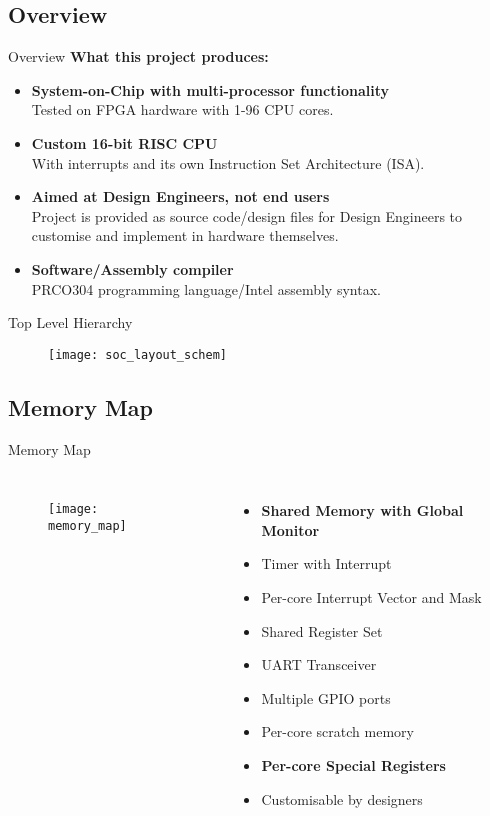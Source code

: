 \documentclass[aspectratio=169]{beamer}
\begin{document}
\subsection{Overview}
\begin{frame}{Overview}
\textbf{What this project produces:}
\begin{itemize}[<+->]\setlength\itemsep{1em}
    \item{\textbf{System-on-Chip with multi-processor functionality}\\
    Tested on FPGA hardware with 1-96 CPU cores.}
    \item{\textbf{Custom 16-bit RISC CPU}\\
    With interrupts and its own Instruction Set Architecture (ISA).}
    \item{\textbf{Aimed at Design Engineers, not end users}\\
    Project is provided as source code/design files for Design Engineers to customise and implement in hardware themselves.}
    \item{\textbf{Software/Assembly compiler}\\
    PRCO304 programming language/Intel assembly syntax.}
\end{itemize}
\end{frame}

\begin{frame}{Top Level Hierarchy}
\vspace{-.3cm}
\begin{figure}
\texttt{[image: soc\_layout\_schem]}
\end{figure}
\end{frame}

\subsection{Memory Map}
\begin{frame}{Memory Map}
\begin{columns}
\begin{figure}
\texttt{[image: memory\_map]}
\end{figure}
\begin{itemize}
    \item \textbf{Shared Memory with Global Monitor}
    \item Timer with Interrupt
    \item Per-core Interrupt Vector and Mask
    \item Shared Register Set
    \item UART Transceiver
    \item Multiple GPIO ports
    \item Per-core scratch memory
    \item \textbf{Per-core Special Registers}
    \item Customisable by designers
\end{itemize}
\end{columns}
\end{frame}
\end{document}
